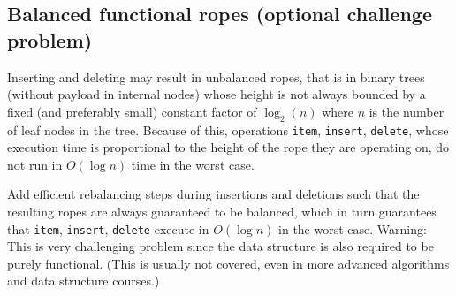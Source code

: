 \documentclass[a4paper,11pt]{article}
\begin{document}
\subsection{Balanced functional ropes (optional challenge problem)}

Inserting and deleting may result in unbalanced ropes, that is in binary trees (without payload in internal nodes) whose height is not always bounded by a fixed  (and preferably small) constant factor of $\log_2 (n)$ where $n$ is the number of leaf nodes in the tree.  Because of this, operations \verb|item|, \verb|insert|, \verb|delete|, whose execution time is proportional to the height of the rope they are operating on, do not run in $O(\log n)$ time in the worst case.  

Add efficient rebalancing steps during insertions and deletions such that the resulting ropes are always guaranteed to be balanced, which in turn guarantees that \verb|item|, \verb|insert|, \verb|delete| execute in $O(\log n)$ in the worst case.  Warning: This is very challenging problem since the data structure is also required to be purely functional. (This is usually not covered, even in more advanced algorithms and data structure courses.) 
\end{document}
